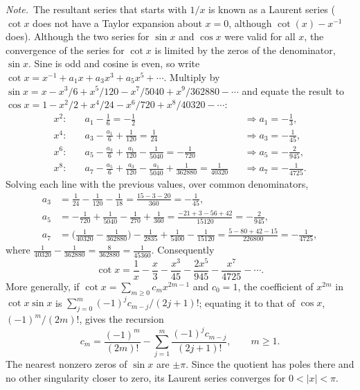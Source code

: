 \emph{Note.}~The resultant series that starts with $1/x$ is known as a Laurent
series ($\cot x$ does not have a Taylor expansion about $x=0$, although
$\cot(x)-x^{-1}$ does). Although the two series for $\sin x$ and $\cos x$ were
valid for all $x$, the convergence of the series for $\cot x$ is limited by
the zeros of the denominator, $\sin x$.
\solution
Sine is odd and cosine is even, so write
$\cot x=x^{-1}+a_1x+a_3x^3+a_5x^5+\cdots$.
Multiply by $\sin x=x-x^3/6+x^5/120-x^7/5040+x^9/362880-\cdots$ and
equate the result to $\cos x=1-x^2/2+x^4/24-x^6/720+x^8/40320-\cdots$:
\[
 \begin{aligned}
 x^2:&\quad a_1-\tfrac16=-\tfrac12 &&\Rightarrow a_1=-\tfrac13,\\
 x^4:&\quad a_3-\tfrac{a_1}6+\tfrac1{120}=\tfrac1{24}
       &&\Rightarrow a_3=-\tfrac1{45},\\
 x^6:&\quad a_5-\tfrac{a_3}6+\tfrac{a_1}{120}-\tfrac1{5040}
            =-\tfrac1{720}&&\Rightarrow a_5=-\tfrac2{945},\\
 x^8:&\quad a_7-\tfrac{a_5}6+\tfrac{a_3}{120}-\tfrac{a_1}{5040}
             +\tfrac1{362880}=\tfrac1{40320}
       &&\Rightarrow a_7=-\tfrac1{4725}.
 \end{aligned}
\]
Solving each line with the previous values, over common denominators,
\[
 \begin{aligned}
 a_3&=\tfrac1{24}-\tfrac1{120}-\tfrac1{18}=\tfrac{15-3-20}{360}=-\tfrac1{45},\\
 a_5&=-\tfrac1{720}+\tfrac1{5040}-\tfrac1{270}+\tfrac1{360}
     =\tfrac{-21+3-56+42}{15120}=-\tfrac2{945},\\
 a_7&=\bigl(\tfrac1{40320}-\tfrac1{362880}\bigr)-\tfrac1{2835}+\tfrac1{5400}-\tfrac1{15120}
     =\tfrac{5-80+42-15}{226800}=-\tfrac1{4725},
 \end{aligned}
\]
where $\tfrac1{40320}-\tfrac1{362880}=\tfrac8{362880}=\tfrac1{45360}$.
Consequently
\[
 \cot x=\frac1x-\frac x3-\frac{x^3}{45}-\frac{2x^5}{945}
         -\frac{x^7}{4725}-\cdots.
\]
More generally, if $\cot x=\sum_{m\ge0}c_m x^{2m-1}$ and $c_0=1$, the
coefficient of $x^{2m}$ in $\cot x\sin x$ is
$\sum_{j=0}^m(-1)^jc_{m-j}/(2j+1)!$; equating it to that of $\cos x$,
$(-1)^m/(2m)!$, gives the recursion
\[
 c_m=\frac{(-1)^m}{(2m)!}
       -\sum_{j=1}^m\frac{(-1)^j c_{m-j}}{(2j+1)!},\qquad m\ge1.
\]
The nearest nonzero zeros of $\sin x$ are $\pm\pi$. Since the quotient
has poles there and no other singularity closer to zero, its Laurent
series converges for $0<|x|<\pi$.


